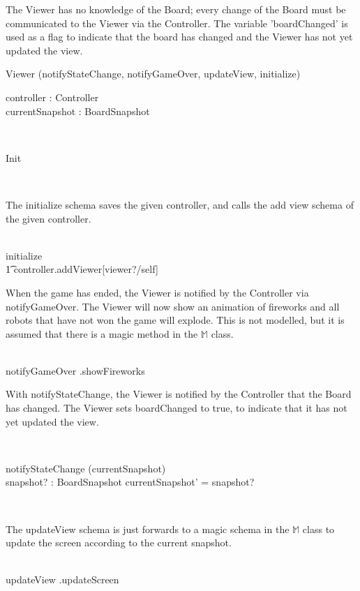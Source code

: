 The Viewer has no knowledge of the Board; every change of the Board must be communicated to the Viewer via the Controller. The variable 'boardChanged' is used as a flag to indicate that the board has changed and the Viewer has not yet updated the view.
\begin{class}{Viewer}
\upharpoonright (notifyStateChange, notifyGameOver, updateView, initialize) \\
\begin{state}
controller : Controller \\
currentSnapshot : BoardSnapshot \\
\end{state}\\
\begin{schema}{Init}
\end{schema}\\
\begin{zpar}
The initialize schema saves the given controller, and calls the add view schema of the given controller.
\end{zpar} \\
initialize \sdef [\Delta(controller), c? : Controller | controller' = c] \;\; \comp \\ \t1 controller.addViewer[viewer?/self] \\
\begin{zpar}
When the game has ended, the Viewer is notified by the Controller via notifyGameOver. The Viewer will now show an animation of fireworks and all robots that have not won the game will explode. This is not modelled, but it is assumed that there is a magic method in the $\mathbb{M}$ class.
\end{zpar} \\
notifyGameOver \sdef {}.showFireworks \\
\begin{zpar}
With notifyStateChange, the Viewer is notified by the Controller that the Board has changed. The Viewer sets boardChanged to true, to indicate that it has not yet updated the view.
\end{zpar} \\
\begin{schema}{notifyStateChange}
\Delta (currentSnapshot) \\
snapshot? : BoardSnapshot
\where
currentSnapshot' = snapshot?
\end{schema}\\
\znewpage
\begin{zpar}
The updateView schema is just forwards to a magic schema in the $\mathbb{M}$ class to update the screen according to the current snapshot.
\end{zpar} \\
updateView \sdef {}.updateScreen
\end{class}

